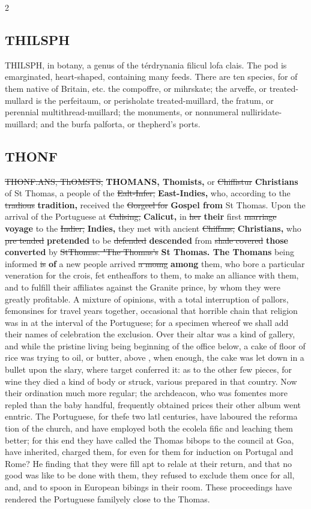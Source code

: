 \documentclass[10pt]{article}
\begin{document}
\begin{multicols}{2}
\subsection*{THILSPH}
THILSPH, in botany, a genus of the térdrynania filicul lofa clais. The pod is emarginated, heart-shaped, containing many feeds. There are ten species, for of them native of Britain, etc. the compoffre, or mihrskate; the arveffe, or treated-mullard is the perfeitaum, or perisholate treated-muillard, the fratum, or perennial multithread-muillard; the monuments, or nonnumeral nulliridate-muillard; and the burfa palforta, or thepherd's ports.

\subsection*{THONF}
\sout{THONF.ANS, ThOMSTS,} \textbf{THOMANS, Thomists,} or \sout{Chiffistur} \textbf{Christians} of St Thomas, a people of the \sout{Ealt-Infer,} \textbf{East-Indies,} who, according to the \sout{tradious} \textbf{tradition,} received the \sout{Gorgeel for} \textbf{Gospel from} St Thomas. Upon the arrival of the Portuguese at \sout{Calising,} \textbf{Calicut,} in \sout{her} \textbf{their} first \sout{marriage} \textbf{voyage} to the \sout{Indier,} \textbf{Indies,} they met with ancient \sout{Chiffans,} \textbf{Christians,} who \sout{pre tended} \textbf{pretended} to be \sout{defended} \textbf{descended} from \sout{shale covered} \textbf{those converted} by \sout{StThomas. "The Thomas’s} \textbf{St Thomas. The Thomans} being informed \sout{is} \textbf{of} a new people arrived \sout{a momg} \textbf{among} them, who bore a particular veneration for the crois, fet entheaffors to them, to make an alliance with them, and to fulfill their affiliates against the Granite prince, by whom they were greatly profitable. A mixture of opinions, with a total interruption of pallors, femonsines for travel years together, occasional that horrible chain that religion was in at the interval of the Portuguese; for a specimen whereof we shall add their names of celebration the exclusion. Over their altar was a kind of gallery, and while the pristine living being beginning of the office below, a cake of floor of rice was trying to oil, or butter, above , when enough, the cake was let down in a bullet upon the slary, where target conferred it: as to the other few pieces, for wine they died a kind of body or struck, various prepared in that country. Now their ordination much more regular; the archdeacon, who was fomentes more repled than the baby handful, frequently obtained prices their other album went enntric. The Portuguese, for thefe two latl centuries, have laboured the reforma tion of the church, and have employed both the ecolela fific and leaching them better; for this end they have called the Thomas bibops to the council at Goa, have inherited, charged them, for even for them for induction on Portugal and Rome? He finding that they were fill apt to relale at their return, and that no good was like to be done with them, they refused to exclude them once for all, and, and to spoon in European bibings in their room. These proceedings have rendered the Portuguese familyely close to the Thomas.


\end{multicols}
\end{document}
